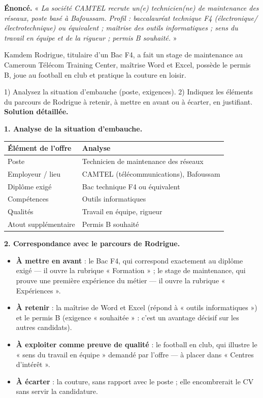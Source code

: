 \documentclass[11pt]{article}
\begin{document}
\begin{exoresolu}
\textbf{Énoncé.} « \emph{La société CAMTEL recrute un(e) technicien(ne) de maintenance des réseaux, poste basé à Bafoussam. Profil : baccalauréat technique F4 (électronique/électrotechnique) ou équivalent ; maîtrise des outils informatiques ; sens du travail en équipe et de la rigueur ; permis B souhaité.} »

Kamdem Rodrigue, titulaire d'un Bac F4, a fait un stage de maintenance au Cameroun Télécom Training Center, maîtrise Word et Excel, possède le permis B, joue au football en club et pratique la couture en loisir.

1) Analysez la situation d'embauche (poste, exigences). 2) Indiquez les éléments du parcours de Rodrigue à retenir, à mettre en avant ou à écarter, en justifiant.
\tcblower
\textbf{Solution détaillée.}

\textbf{1. Analyse de la situation d'embauche.}
\begin{center}
\begin{tabularx}{\linewidth}{|l|X|}
\hline
\rowcolor{popblueL} \textbf{Élément de l'offre} & \textbf{Analyse} \\
\hline
Poste & Technicien de maintenance des réseaux \\
\hline
Employeur / lieu & CAMTEL (télécommunications), Bafoussam \\
\hline
Diplôme exigé & Bac technique F4 ou équivalent \\
\hline
Compétences & Outils informatiques \\
\hline
Qualités & Travail en équipe, rigueur \\
\hline
Atout supplémentaire & Permis B souhaité \\
\hline
\end{tabularx}
\end{center}

\textbf{2. Correspondance avec le parcours de Rodrigue.}
\begin{itemize}
\item \textbf{À mettre en avant} : le Bac F4, qui correspond exactement au diplôme exigé — il ouvre la rubrique « Formation » ; le stage de maintenance, qui prouve une première expérience du métier — il ouvre la rubrique « Expériences ».
\item \textbf{À retenir} : la maîtrise de Word et Excel (répond à « outils informatiques ») et le permis B (exigence « souhaitée » : c'est un avantage décisif sur les autres candidats).
\item \textbf{À exploiter comme preuve de qualité} : le football en club, qui illustre le « sens du travail en équipe » demandé par l'offre — à placer dans « Centres d'intérêt ».
\item \textbf{À écarter} : la couture, sans rapport avec le poste ; elle encombrerait le CV sans servir la candidature.
\end{itemize}


\end{exoresolu}
\end{document}
